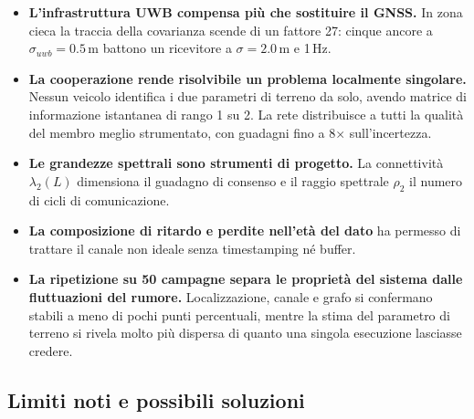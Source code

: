 \documentclass[conference,9pt]{IEEEtran}
\begin{document}
\begin{itemize}
\item \textbf{L'infrastruttura UWB compensa pi\`u che sostituire il GNSS.} In
      zona cieca la traccia della covarianza scende di un fattore 27: cinque
      ancore a $\sigma_{uwb} = 0.5$\,m battono un ricevitore a $\sigma = 2.0$\,m e
      1\,Hz.
\item \textbf{La cooperazione rende risolvibile un problema localmente
      singolare.} Nessun veicolo identifica i due parametri di terreno da solo,
      avendo matrice di informazione istantanea di rango 1 su 2. La rete
      distribuisce a tutti la qualit\`a del membro meglio strumentato, con
      guadagni fino a 8$\times$ sull'incertezza.
\item \textbf{Le grandezze spettrali sono strumenti di progetto.} La
      connettivit\`a $\lambda_2(L)$ dimensiona il guadagno di consenso e il
      raggio spettrale $\rho_2$ il numero di cicli di comunicazione.
\item \textbf{La composizione di ritardo e perdite nell'et\`a del dato} ha
      permesso di trattare il canale non ideale senza timestamping n\'e buffer.
\item \textbf{La ripetizione su 50 campagne separa le propriet\`a del sistema
      dalle fluttuazioni del rumore.} Localizzazione, canale e grafo si
      confermano stabili a meno di pochi punti percentuali, mentre la stima del
      parametro di terreno si rivela molto pi\`u dispersa di quanto una singola
      esecuzione lasciasse credere.
\end{itemize}

\subsection{Limiti noti e possibili soluzioni}
\end{document}
